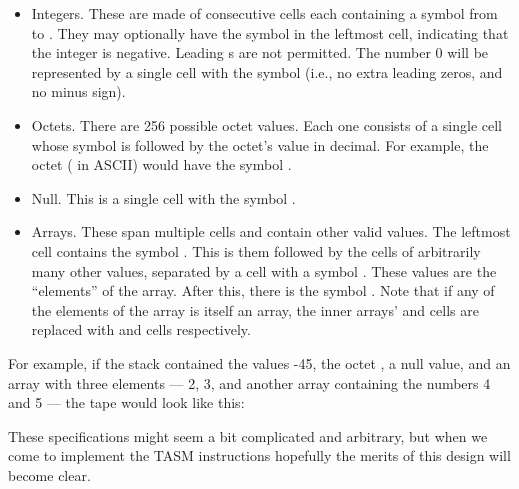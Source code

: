 \begin{itemize}
    \item Integers. These are made of consecutive cells each containing a symbol from  to . They may optionally have the symbol \symb{-} in the leftmost cell, indicating that the integer is negative. Leading s are not permitted. The number 0 will be represented by a single cell with the symbol  (i.e., no extra leading zeros, and no minus sign).
    \item Octets. There are 256 possible octet values. Each one consists of a single cell whose symbol is  followed by the octet's value in decimal. For example, the octet  ( in ASCII) would have the symbol .
    \item Null. This is a single cell with the symbol .
    \item Arrays. These span multiple cells and contain other valid values. The leftmost cell contains the symbol \symb{(}. This is them followed by the cells of arbitrarily many other values, separated by a cell with a symbol \symb{;}. These values are the ``elements'' of the array. After this, there is the symbol \symb{)}. Note that if any of the elements of the array is itself an array, the inner arrays' \symb{(} and \symb{)} cells are replaced with \symb{[} and \symb{]} cells respectively.
\end{itemize}

For example, if the stack contained the values -45, the octet , a null value, and an array with three elements --- 2, 3, and another array containing the numbers 4 and 5 --- the tape would look like this:

\begin{center}
\end{center}

These specifications might seem a bit complicated and arbitrary, but when we come to implement the TASM instructions hopefully the merits of this design will become clear.